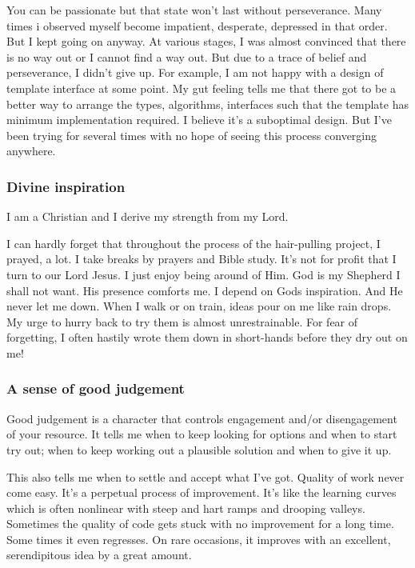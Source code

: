 You can be passionate but that state won't last without perseverance.
Many times i observed myself become impatient, desperate, depressed in that order.
But I kept going on anyway.
At various stages, I was almost convinced that there is no way out or I cannot find a way out.
But due to a trace of belief and perseverance, I didn't give up.
For example, I am not happy with a design of template interface at some point.
My gut feeling tells me that there got to be a better way to arrange the types, algorithms, interfaces such that
the template has minimum implementation required.
I believe it's a suboptimal design.
But I've been trying for several times with no hope of seeing this process converging anywhere.

\subsubsection{Divine inspiration}

I am a Christian and I derive my strength from my Lord.

I can hardly forget that throughout the process of the hair-pulling project, I prayed, a lot.
I take breaks by prayers and Bible study.
It's not for profit that I turn to our Lord Jesus.
I just enjoy being around of Him.
God is my Shepherd I shall not want.
His presence comforts me.
I depend on Gods inspiration.
And He never let me down.
When I walk or on train, ideas pour on me like rain drops.
My urge to hurry back to try them is almost unrestrainable.
For fear of forgetting, I often hastily wrote them down in short-hands before they dry out on me!

\subsubsection{A sense of good judgement}

Good judgement is a character that controls engagement and/or disengagement of your resource.
It tells me when to keep looking for options and when to start try out;
when to keep working out a plausible solution and when to give it up.

This also tells me when to settle and accept what I've got.
Quality of work never come easy.
It's a perpetual process of improvement.
It's like the learning curves which is often nonlinear with steep and hart ramps and drooping
valleys.
Sometimes the quality of code gets stuck with no improvement for a long time.
Some times it even regresses.
On rare occasions, it improves with an excellent, serendipitous idea by a great amount.


